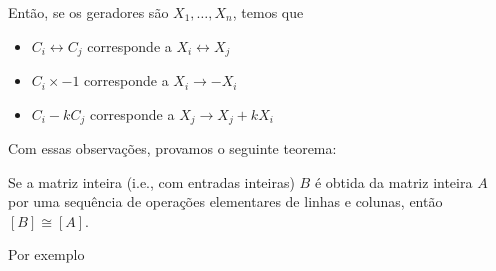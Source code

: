     	\par\vspace{0.3cm} Então, se os geradores são $X_1, \dots, X_n$, temos que
    	\begin{itemize}
    		\item $C_i\leftrightarrow C_j$ corresponde a $X_i\leftrightarrow X_j$
    		\item $C_i\times-1$ corresponde a $X_i\to -X_i$
    		\item $C_i -kC_j$ corresponde a $X_j\to X_j + kX_i$
    	\end{itemize}
    	\par\vspace{0.3cm} Com essas observações, provamos o seguinte teorema:
    	\begin{theorem}
    	\label{equivalencia matrizes}
    		Se a matriz inteira (i.e., com entradas inteiras) $B$ é obtida da matriz inteira $A$ 
    		por uma sequência de operações elementares de linhas e colunas, então $[B]\cong[A]$.
    	\end{theorem}
    	\par\vspace{0.3cm} Por exemplo
